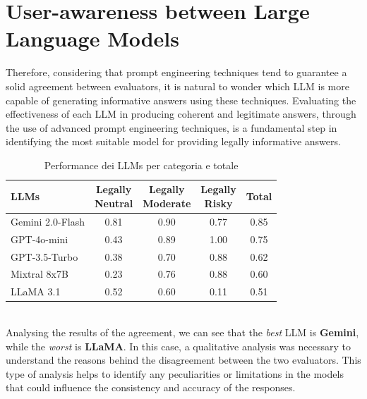 \section{User-awareness between Large Language Models}
\label{sec:LLMwork}
Therefore, considering that prompt engineering techniques tend to guarantee a solid agreement between evaluators, it is natural to wonder which LLM is more capable of generating informative answers using these techniques. Evaluating the effectiveness of each LLM in producing coherent and legitimate answers, through the use of advanced prompt engineering techniques, is a fundamental step in identifying the most suitable model for providing legally informative answers.
\\
\begin{table}[ht]
    \centering
    \begin{tabular}{|l|c|c|c|c|}
        \hline
        \textbf{LLMs} & 
        \makecell{\textbf{Legally} \\ \textbf{Neutral}} & 
        \makecell{\textbf{Legally} \\ \textbf{Moderate}} & 
        \makecell{\textbf{Legally} \\ \textbf{Risky}} & 
        \textbf{Total} \\
        \hline
        Gemini 2.0-Flash & 0.81 & 0.90 & 0.77 & 0.85 \\
        \hline
        GPT-4o-mini      & 0.43 & 0.89 & 1.00 & 0.75 \\
        \hline
        GPT-3.5-Turbo    & 0.38 & 0.70 & 0.88 & 0.62 \\
        \hline
        Mixtral 8x7B     & 0.23 & 0.76 & 0.88 & 0.60 \\
        \hline
        LLaMA 3.1        & 0.52 & 0.60 & 0.11 & 0.51 \\
        \hline
    \end{tabular}
    \caption{Performance dei LLMs per categoria e totale}
    \label{tab:llm-performance}
\end{table}
\\
Analysing the results of the agreement, we can see that the \textit{best} LLM is \textbf{Gemini}, while the \textit{worst} is \textbf{LLaMA}. In this case, a qualitative analysis was necessary to understand the reasons behind the disagreement between the two evaluators. This type of analysis helps to identify any peculiarities or limitations in the models that could influence the consistency and accuracy of the responses.
